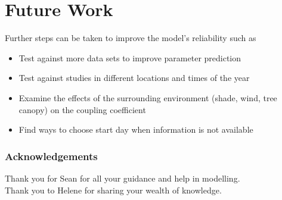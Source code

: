 \documentclass{beamer}
\begin{document}
\section{Future Work}
\begin{frame}
Further steps can be taken to improve the model's reliability such as
\begin{itemize}
\item Test against more data sets to improve parameter prediction
\item Test against studies in different locations and times of the
  year
  \item Examine the effects of the surrounding environment (shade, wind,
    tree canopy) on the coupling coefficient
\item Find ways to choose start day when information is not available
\end{itemize}
\end{frame}

\begin{frame}
\frametitle{Acknowledgements}
Thank you for Sean for all your guidance and help in modelling. \\

Thank you to Helene for sharing your wealth of knowledge.

\end{frame}
\end{document}
